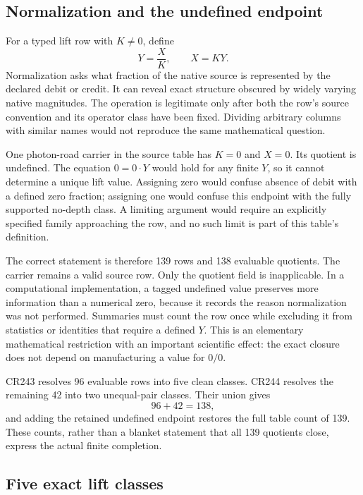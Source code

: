 \subsection{Normalization and the undefined endpoint}

For a typed lift row with $K\ne0$, define
\begin{equation}
Y=\frac{X}{K},\qquad X=KY.
\label{v2c3:lift}
\end{equation}
Normalization asks what fraction of the native source is represented by the declared debit or credit. It can reveal exact structure obscured by widely varying native magnitudes. The operation is legitimate only after both the row's source convention and its operator class have been fixed. Dividing arbitrary columns with similar names would not reproduce the same mathematical question.

One photon-road carrier in the source table has $K=0$ and $X=0$. Its quotient is undefined. The equation $0=0\cdot Y$ would hold for any finite $Y$, so it cannot determine a unique lift value. Assigning zero would confuse absence of debit with a defined zero fraction; assigning one would confuse this endpoint with the fully supported no-depth class. A limiting argument would require an explicitly specified family approaching the row, and no such limit is part of this table's definition.

The correct statement is therefore 139 rows and 138 evaluable quotients. The carrier remains a valid source row. Only the quotient field is inapplicable. In a computational implementation, a tagged undefined value preserves more information than a numerical zero, because it records the reason normalization was not performed. Summaries must count the row once while excluding it from statistics or identities that require a defined $Y$. This is an elementary mathematical restriction with an important scientific effect: the exact closure does not depend on manufacturing a value for $0/0$.

CR243 resolves 96 evaluable rows into five clean classes. CR244 resolves the remaining 42 into two unequal-pair classes. Their union gives
\begin{equation}
96+42=138,
\end{equation}
and adding the retained undefined endpoint restores the full table count of 139. These counts, rather than a blanket statement that all 139 quotients close, express the actual finite completion.

\subsection{Five exact lift classes}

